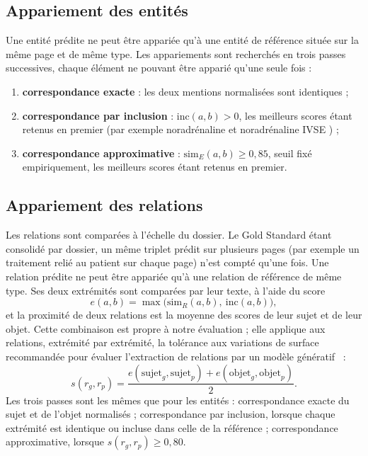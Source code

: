 \subsection{Appariement des entités}

Une entité prédite ne peut être appariée qu'à une entité de référence située sur la même page et de même type. Les appariements sont recherchés en trois passes successives, chaque élément ne pouvant être apparié qu'une seule fois :
\begin{enumerate}
  \item \textbf{correspondance exacte} : les deux mentions normalisées sont identiques ;
  \item \textbf{correspondance par inclusion} : $\mathrm{inc}(a,b) > 0$, les meilleurs scores étant retenus en premier (par exemple \og noradrénaline \fg{} et \og noradrénaline IVSE \fg{}) ;
  \item \textbf{correspondance approximative} : $\mathrm{sim}_E(a,b) \geq 0{,}85$, seuil fixé empiriquement, les meilleurs scores étant retenus en premier.
\end{enumerate}

\subsection{Appariement des relations}

Les relations sont comparées à l'échelle du dossier. Le Gold Standard étant consolidé par dossier, un même triplet prédit sur plusieurs pages (par exemple un traitement relié au patient sur chaque page) n'est compté qu'une fois. Une relation prédite ne peut être appariée qu'à une relation de référence de même type. Ses deux extrémités sont comparées par leur texte, à l'aide du score
\begin{equation}
e(a, b) = \max\big(\mathrm{sim}_R(a,b),\ \mathrm{inc}(a,b)\big),
\end{equation}
et la proximité de deux relations est la moyenne des scores de leur sujet et de leur objet. Cette combinaison est propre à notre évaluation ; elle applique aux relations, extrémité par extrémité, la tolérance aux variations de surface recommandée pour évaluer l'extraction de relations par un modèle génératif~\cite{wadhwa2023revisiting} :
\begin{equation}
s(r_g, r_p) = \frac{e(\mathrm{sujet}_g, \mathrm{sujet}_p) + e(\mathrm{objet}_g, \mathrm{objet}_p)}{2}.
\end{equation}
Les trois passes sont les mêmes que pour les entités : correspondance exacte du sujet et de l'objet normalisés ; correspondance par inclusion, lorsque chaque extrémité est identique ou incluse dans celle de la référence ; correspondance approximative, lorsque $s(r_g, r_p) \geq 0{,}80$.

